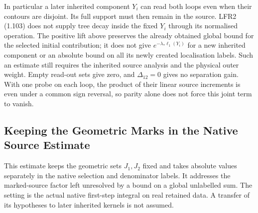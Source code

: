 \documentclass[11pt]{article}
\begin{document}
In particular a later inherited component $Y_i$ can read both
loops even when their contours are disjoint. Its full support
must then remain in the source. LFR2 (1.103) does not supply
tree decay inside the fixed $Y_i$ through its normalised
operation. The positive lift above preserves the already
obtained global bound for the selected initial contribution;
it does not give $e^{-\lambda_*\ell_1(Y_i)}$ for a new
inherited component or an absolute bound on all its newly
created localisation labels. Such an estimate still requires
the inherited source analysis and the physical outer weight.
Empty read-out sets give zero, and $\Delta_{12}=0$ gives no
separation gain. With one probe on each loop, the product of
their linear source increments is even under a common sign
reversal, so parity alone does not force this joint term
to vanish.

\subsection{Keeping the Geometric Marks in the Native Source Estimate}
\label{sec:c8-fourth-fixed-geometric}

This estimate keeps the geometric sets $J_1,J_2$ fixed and
takes absolute values separately in the native selection and
denominator labels. It addresses the marked-source factor
left unresolved by a bound on a global unlabelled sum.
The setting is the actual native first-step integral on real
retained data. A transfer of its hypotheses to later inherited
kernels is not assumed.
\end{document}
